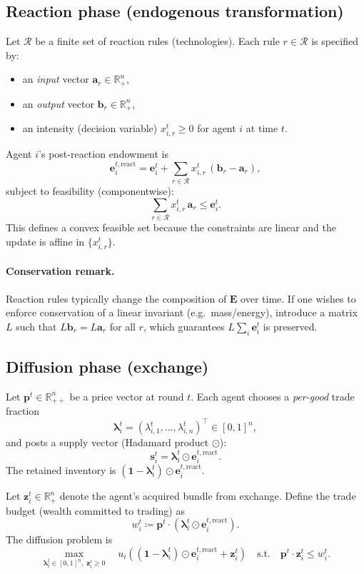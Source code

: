 \documentclass[11pt]{article}
\begin{document}
\subsection{Reaction phase (endogenous transformation)}

Let \(\mathcal{R}\) be a finite set of reaction rules (technologies). Each rule \(r \in \mathcal{R}\) is specified by:
\begin{itemize}[leftmargin=*]
  \item an \emph{input} vector \(\bm{a}_r \in \mathbb{R}_+^n\),
  \item an \emph{output} vector \(\bm{b}_r \in \mathbb{R}_+^n\),
  \item an intensity (decision variable) \(x_{i,r}^t \ge 0\) for agent \(i\) at time \(t\).
\end{itemize}
Agent \(i\)'s post-reaction endowment is
\[
\bm{e}_i^{t,\mathrm{react}}
  = \bm{e}_i^{t}
    + \sum_{r \in \mathcal{R}} x_{i,r}^{t}\,(\bm{b}_r-\bm{a}_r),
\]
subject to feasibility (componentwise):
\[
\sum_{r \in \mathcal{R}} x_{i,r}^{t}\,\bm{a}_r \le \bm{e}_i^{t}.
\]
This defines a convex feasible set because the constraints are linear and the update is affine in \(\{x_{i,r}^t\}\).

\paragraph{Conservation remark.}
Reaction rules typically change the composition of \(\bm{E}\) over time. If one wishes to enforce conservation of a
linear invariant (e.g.\ mass/energy), introduce a matrix \(L\) such that \(L\bm{b}_r = L\bm{a}_r\) for all \(r\),
which guarantees \(L\sum_i \bm{e}_i^t\) is preserved.

\subsection{Diffusion phase (exchange)}

Let \(\bm{p}^t \in \mathbb{R}_{++}^n\) be a price vector at round \(t\).
Each agent chooses a \emph{per-good} trade fraction
\[
\bm{\lambda}_i^t = (\lambda_{i,1}^t,\dots,\lambda_{i,n}^t)^\top \in [0,1]^n,
\]
and posts a supply vector (Hadamard product \(\odot\)):
\[
\bm{s}_i^t = \bm{\lambda}_i^t \odot \bm{e}_i^{t,\mathrm{react}}.
\]
The retained inventory is \((\bm{1}-\bm{\lambda}_i^t)\odot\bm{e}_i^{t,\mathrm{react}}\).

Let \(\bm{z}_i^t \in \mathbb{R}_+^n\) denote the agent's acquired bundle from exchange. Define the trade budget
(wealth committed to trading) as
\[
w_i^t \coloneqq \bm{p}^t \cdot (\bm{\lambda}_i^t \odot \bm{e}_i^{t,\mathrm{react}}).
\]
The diffusion problem is
\begin{equation}
\label{eq:diffusion-problem}
\max_{\bm{\lambda}_i^t \in [0,1]^n,\;\bm{z}_i^t \ge 0}
\quad
u_i\!\left((\bm{1}-\bm{\lambda}_i^t)\odot\bm{e}_i^{t,\mathrm{react}} + \bm{z}_i^t\right)
\quad\text{s.t.}\quad
\bm{p}^t \cdot \bm{z}_i^t \le w_i^t.
\end{equation}
\end{document}
